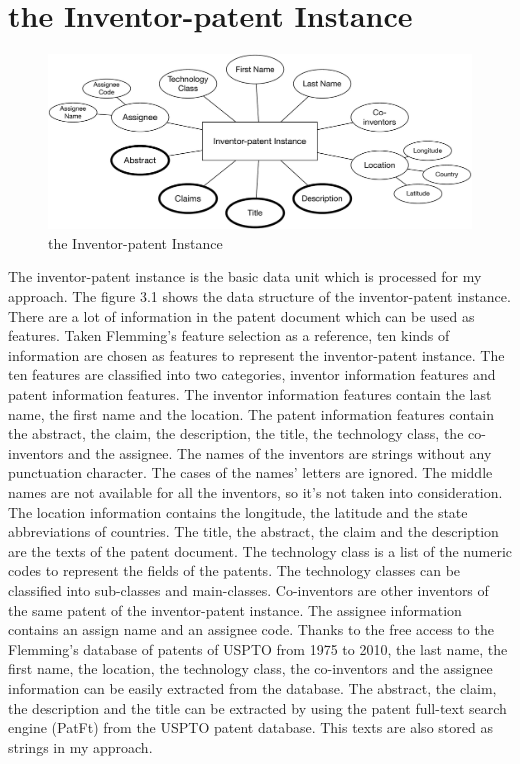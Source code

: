 \section{the Inventor-patent Instance}
\begin{figure}
\centering
\includegraphics[width=\headwidth]{Patent-inventorUnit.pdf}
\caption{the Inventor-patent Instance}
\end{figure}
The inventor-patent instance is the basic data unit which is processed for my approach. The figure 3.1 shows the data structure of the inventor-patent instance. There are a lot of information in the patent document which can be used as features. Taken Flemming's feature selection \cite{RePEc:eee:respol:v:43:y:2014:i:6:p:941-955} as a reference, ten kinds of information are chosen as features to represent the inventor-patent instance. The ten features are classified into two categories, inventor information features and patent information features. The inventor information  features contain the last name, the first name and the location. The patent information features contain the abstract, the claim, the description, the title, the technology class, the co-inventors and the assignee. The names of the inventors are strings without any punctuation character. The cases of the names' letters are ignored. The middle names are not available for all the inventors, so it's not taken into consideration. The location information contains the longitude, the latitude and the state abbreviations of countries. The title, the abstract, the claim and the description are the texts of the patent document. The technology class is a list of the numeric codes to represent the fields of the patents. The technology classes can be classified into sub-classes and main-classes. Co-inventors are other inventors of the same patent of the inventor-patent instance. The assignee information contains an assign name and an assignee code. Thanks to the free access to the Flemming's database of patents of USPTO from 1975 to 2010, the last name, the first name, the location, the technology class, the co-inventors and the assignee information can be easily extracted from the database. The abstract, the claim, the description and  the title can be extracted by using the patent full-text search engine (PatFt) from the USPTO patent database. This texts are also stored as strings in my approach.

